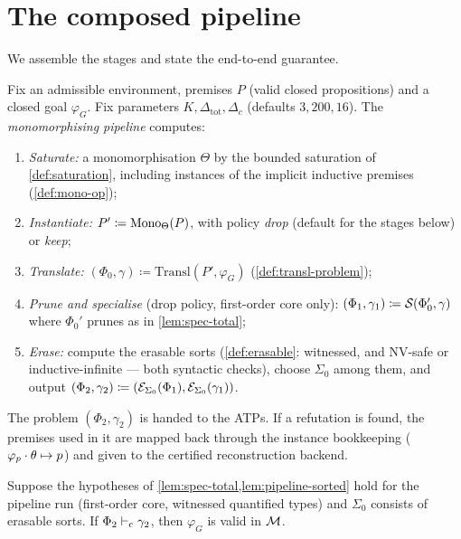 \section{The composed pipeline}
\label{sec:pipeline}

We assemble the stages and state the end-to-end guarantee.

\begin{definition}[Pipeline]
\label{def:pipeline}
Fix an admissible environment, premises $P$ (valid closed
propositions) and a closed goal $\varphi_G$.  Fix parameters $K,
\Delta_{\mathrm{tot}}, \Delta_c$ (defaults $3, 200, 16$).  The
\emph{monomorphising pipeline} computes:
\begin{enumerate}[label=(P\arabic*),leftmargin=3em]
\item \emph{Saturate:} a monomorphisation $\Theta$ by the bounded
  saturation of \cref{def:saturation}, including instances of the
  implicit inductive premises (\cref{def:mono-op});
\item \emph{Instantiate:} $P' \coloneqq \mathrm{Mono}_\Theta(P)$, with
  policy \emph{drop} (default for the stages below) or \emph{keep};
\item \emph{Translate:} $(\Phi_0, \gamma) \coloneqq
  \mathrm{Transl}(P', \varphi_G)$ (\cref{def:transl-problem});
\item \emph{Prune and specialise} (drop policy, first-order core
  only): $(\Phi_1, \gamma_1) \coloneqq \mathcal{S}_{}(\Phi_0', \gamma)$
  where $\Phi_0'$ prunes as in \cref{lem:spec-total};
\item \emph{Erase:} compute the erasable sorts
  (\cref{def:erasable}: witnessed, and NV-safe or
  inductive-infinite --- both syntactic checks), choose $\Sigma_0$
  among them, and output $(\Phi_2, \gamma_2) \coloneqq
  (\mathcal{E}_{\Sigma_0}(\Phi_1), \mathcal{E}_{\Sigma_0}(\gamma_1))$.
\end{enumerate}
The problem $(\Phi_2, \gamma_2)$ is handed to the ATPs.  If a
refutation is found, the premises used in it are mapped back
through the instance bookkeeping ($\varphi_p \cdot \theta \mapsto
p$) and given to the certified reconstruction backend.
\end{definition}

\begin{theorem}
\label{thm:pipeline}
Suppose the hypotheses of
\cref{lem:spec-total,lem:pipeline-sorted} hold for the pipeline run
(first-order core, witnessed quantified types) and $\Sigma_0$
consists of erasable sorts.  If $\Phi_2 \vdash_{\mathrm{c}} \gamma_2$, then
$\varphi_G$ is valid in $\mathcal{M}$.
\end{theorem}

